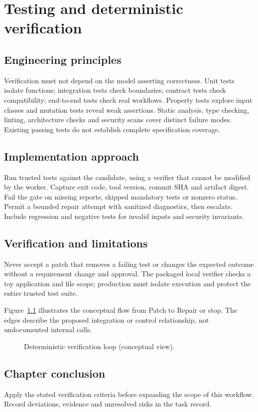 \chapter{Testing and deterministic verification}

\section{Engineering principles}

Verification must not depend on the model asserting correctness. Unit tests isolate functions; integration tests check boundaries; contract tests check compatibility; end-to-end tests check real workflows. Property tests explore input classes and mutation tests reveal weak assertions. Static analysis, type checking, linting, architecture checks and security scans cover distinct failure modes. Existing passing tests do not establish complete specification coverage.

\section{Implementation approach}

Run trusted tests against the candidate, using a verifier that cannot be modified by the worker. Capture exit code, tool version, commit SHA and artifact digest. Fail the gate on missing reports, skipped mandatory tests or nonzero status. Permit a bounded repair attempt with sanitized diagnostics, then escalate. Include regression and negative tests for invalid inputs and security invariants.

\section{Verification and limitations}

Never accept a patch that removes a failing test or changes the expected outcome without a requirement change and approval. The packaged local verifier checks a toy application and file scope; production must isolate execution and protect the entire trusted test suite.

Figure~\ref{fig:d22} illustrates the conceptual flow from Patch to Repair or stop. The edges describe the proposed integration or control relationship, not undocumented internal calls.

\begin{figure}[htbp]\centering\caption{Deterministic verification loop (conceptual view).}\label{fig:d22}\end{figure}

\section{Chapter conclusion}

Apply the stated verification criteria before expanding the scope of this workflow. Record deviations, evidence and unresolved risks in the task record.
